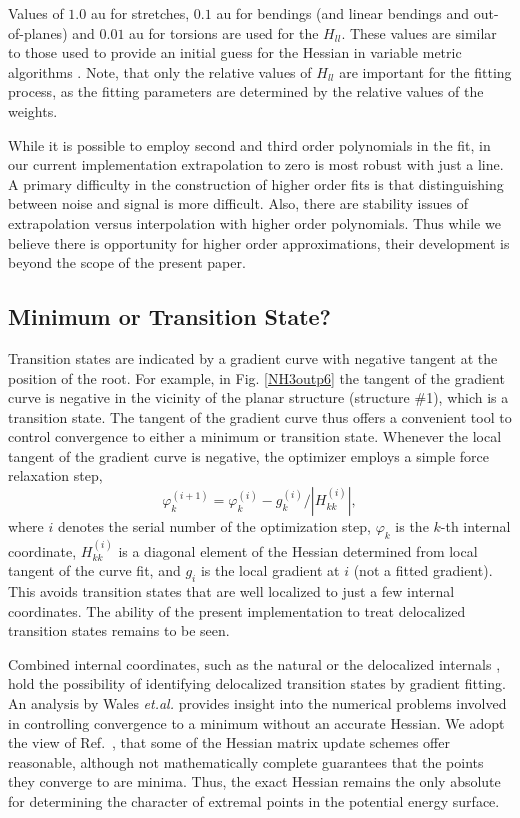 \documentclass[prl,twocolumn,showpacs,twocolumngrid,superbib]{revtex4}
\begin{document}
Values of $1.0$ au for stretches, $0.1$ au for bendings (and linear bendings and out-of-planes) and $0.01$ au
for torsions are used for the $H_{ll}$.  These values are similar to those used to provide 
an initial guess for the Hessian in variable metric algorithms \cite{VBakken02}.  Note, that only the relative 
values of $H_{ll}$ are important for the fitting process, as the fitting parameters are determined by the 
relative values of the weights.  

While it is possible to employ second and third order polynomials in the fit, in our 
current implementation extrapolation to zero is most robust with just a line.  
A primary difficulty in the construction of higher order fits is that distinguishing 
between noise and signal is more difficult.  Also, there are stability 
issues of extrapolation versus interpolation with higher order polynomials.
Thus while we believe there is opportunity for higher order approximations,  
their development is beyond the scope of the present paper.  

\subsection{Minimum or Transition State?}

Transition states are indicated by a gradient curve with  negative tangent at the position
of the root.  For example, in Fig. \ref{NH3outp6} the tangent of the gradient curve is negative 
in the vicinity of the planar structure (structure \#1), which is a transition state. The tangent 
of the gradient curve thus offers a convenient tool to control convergence to either a minimum 
or transition state.  Whenever the local tangent of the gradient curve is negative, the optimizer 
employs a simple force relaxation step,
\begin{equation}
\label{tseq}
\varphi_{k}^{(i+1)} = \varphi_{k}^{(i)} -g_{k}^{(i)}/|H_{kk}^{(i)}| ,
\end{equation}
where $i$ denotes the serial number of the optimization step,  $\varphi_{k}$ is the $k$-th internal coordinate,
 $H^{(i)}_{kk}$ is a diagonal element of the Hessian determined from local tangent of the curve fit, and
$g_i$ is the local gradient at $i$ (not a fitted gradient).
This avoids transition states that are well localized to just a few internal coordinates.
The ability of the present implementation to treat delocalized transition states
remains to be seen. 

Combined internal coordinates, such as the natural \cite{GFogarasi92,MvonArnim99} or the
delocalized internals \cite{JBaker96}, hold the possibility of identifying delocalized transition 
states by gradient fitting.  An analysis by  Wales {\it et.al.} \cite{JUppenbrink92} provides 
insight into the numerical problems involved in controlling convergence to a minimum without an 
accurate Hessian.  
We adopt the view of Ref.~, that
some of the 
Hessian matrix update schemes offer reasonable, although not mathematically
complete guarantees that the points they converge to are minima.
Thus, the exact Hessian remains the only 
absolute for determining the character of extremal points in the potential energy 
surface.
\end{document}
